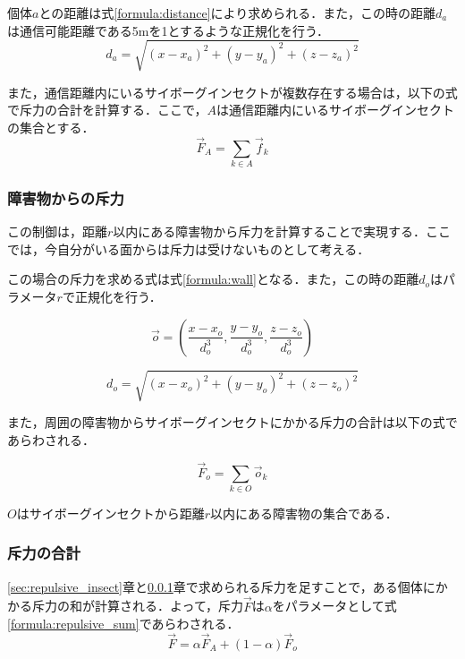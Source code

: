 \documentclass[a4paper,11pt]{jarticle}
\begin{document}
	個体$a$との距離は式\ref{formula:distance}により求められる．また，この時の距離$d_a$は通信可能距離である5mを1とするような正規化を行う．
	\begin{equation}
	\label{formula:distance}
	d_a = \sqrt{(x-x_a)^2+(y-y_a)^2+(z-z_a)^2}
	\end{equation}
	
	また，通信距離内にいるサイボーグインセクトが複数存在する場合は，以下の式で斥力の合計を計算する．ここで，$A$は通信距離内にいるサイボーグインセクトの集合とする．
	\begin{equation}
	\vec{F}_A =　\sum_{k \in A}\vec{f}_k
	\label{formula:repalsive}
	\end{equation}
	
	\subsubsection{障害物からの斥力}
	\label{sec:repulsive_object}
	この制御は，距離$r$以内にある障害物から斥力を計算することで実現する．ここでは，今自分がいる面からは斥力は受けないものとして考える．
	
	この場合の斥力を求める式は式\ref{formula:wall}となる．また，この時の距離$d_o$はパラメータ$r$で正規化を行う．
	
	\begin{equation}
	\vec{o} =  (\frac{x - x_o}{d_o^3},\frac{y- y_o}{d_o^3},\frac{z - z_o}{d_o^3})
	\label{formula:wall}
	\end{equation}
	
	\begin{equation}
	\label{formula:distance_object}
	d_o = \sqrt{(x-x_o)^2+(y-y_o)^2+(z-z_o)^2}	
	\end{equation}
	
	また，周囲の障害物からサイボーグインセクトにかかる斥力の合計は以下の式であらわされる．
	
	\begin{equation}
	\vec{F}_o =　\sum_{k \in O}\vec{o}_k
	\label{formula:repalsive_object}
	\end{equation}
	
	$O$はサイボーグインセクトから距離$r$以内にある障害物の集合である．
	
	\subsubsection{斥力の合計}
	\ref{sec:repulsive_insect}章と\ref{sec:repulsive_object}章で求められる斥力を足すことで，ある個体にかかる斥力の和が計算される．よって，斥力$\vec{F}$は$\alpha$をパラメータとして式\ref{formula:repulsive_sum}であらわされる．
	\begin{equation}
	\vec{F} = \alpha\vec{F}_A + (1 - \alpha)\vec{F}_o
	\label{formula:repulsive_sum}
	\end{equation}
	
\end{document}
